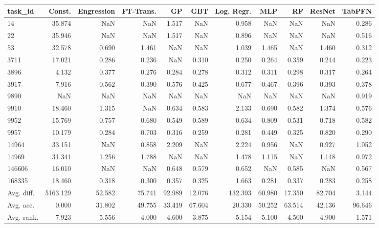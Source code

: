 \begin{tabular}{lrrrrrrrrrr}
\toprule
task\_id & Const. & Engression & FT-Trans. & GP & GBT & Log. Regr. & MLP & RF & ResNet & TabPFN \\
\midrule
14 & 35.874 & NaN & NaN & 1.517 & NaN & 0.958 & NaN & NaN & NaN & 0.286 \\
22 & 35.946 & NaN & NaN & 1.517 & NaN & 0.896 & NaN & NaN & NaN & 0.516 \\
53 & 32.578 & 0.690 & 1.461 & NaN & NaN & 1.039 & 1.465 & NaN & 1.460 & 0.312 \\
3711 & 17.021 & 0.286 & 0.236 & NaN & 0.310 & 0.250 & 0.264 & 0.359 & 0.244 & 0.223 \\
3896 & 4.132 & 0.377 & 0.276 & 0.284 & 0.278 & 0.312 & 0.311 & 0.298 & 0.317 & 0.264 \\
3917 & 7.916 & 0.562 & 0.390 & 0.576 & 0.425 & 0.677 & 0.467 & 0.396 & 0.393 & 0.378 \\
9890 & NaN & NaN & NaN & NaN & NaN & NaN & NaN & NaN & NaN & 0.919 \\
9910 & 18.460 & 1.315 & NaN & 0.634 & 0.583 & 2.133 & 0.690 & 0.582 & 1.374 & 0.576 \\
9952 & 15.769 & 0.757 & 0.680 & 0.549 & 0.589 & 0.634 & 0.809 & 0.531 & 0.718 & 0.582 \\
9957 & 10.179 & 0.284 & 0.703 & 0.316 & 0.259 & 0.281 & 0.449 & 0.325 & 0.820 & 0.290 \\
14964 & 33.151 & NaN & 0.858 & 2.209 & NaN & 2.224 & 0.956 & NaN & 0.927 & 1.052 \\
14969 & 31.341 & 1.256 & 1.788 & NaN & NaN & 1.478 & 1.115 & NaN & 1.148 & 0.972 \\
146606 & 16.010 & NaN & NaN & 0.648 & 0.579 & 0.652 & NaN & 0.585 & NaN & 0.567 \\
168335 & 18.460 & 0.318 & 0.300 & 0.357 & 0.325 & 1.663 & 0.281 & 0.337 & 0.283 & 0.258 \\
Avg. diff. & 5163.129 & 52.582 & 75.741 & 92.989 & 12.076 & 132.393 & 60.980 & 17.350 & 82.704 & 3.144 \\
Avg. acc. & 0.000 & 31.802 & 49.755 & 33.419 & 67.604 & 20.330 & 50.252 & 63.514 & 42.136 & 96.646 \\
Avg. rank. & 7.923 & 5.556 & 4.000 & 4.600 & 3.875 & 5.154 & 5.100 & 4.500 & 4.900 & 1.571 \\
\bottomrule
\end{tabular}
